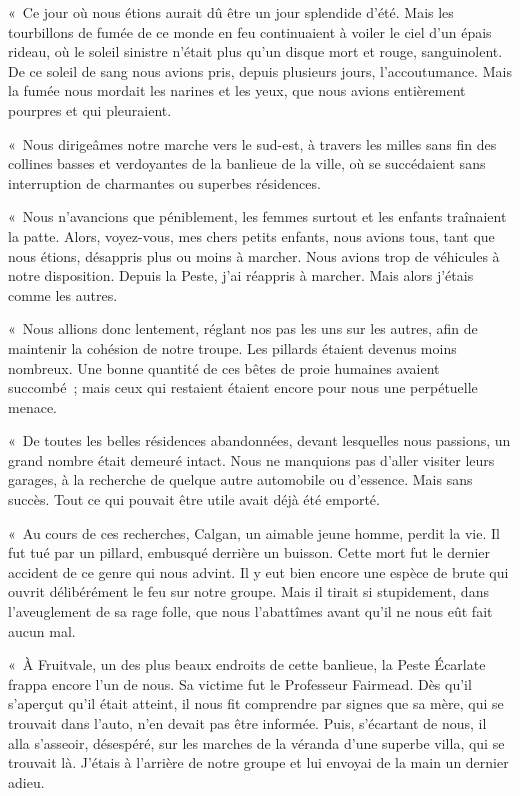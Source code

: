 \documentclass[french,twoside]{book} %
\newcommand\chaptercont{} %
\begin{document}
\chaptercont
\noindent « Ce jour où nous étions aurait dû être un jour splendide d’été. Mais les tourbillons de fumée de ce monde en feu continuaient à voiler le ciel d’un épais rideau, où le soleil sinistre n’était plus qu’un disque mort et rouge, sanguinolent. De ce soleil de sang nous avions pris, depuis plusieurs jours, l’accoutumance. Mais la fumée nous mordait les narines et les yeux, que nous avions entièrement pourpres et qui pleuraient.\par
« Nous dirigeâmes notre marche vers le sud-est, à travers les milles sans fin des collines basses et verdoyantes de la banlieue de la ville, où se succédaient sans interruption de charmantes ou superbes résidences.\par
« Nous n’avancions que péniblement, les femmes surtout et les enfants traînaient la patte. Alors, voyez-vous, mes chers petits enfants, nous avions tous, tant que nous étions, désappris plus ou moins à marcher. Nous avions trop de véhicules à notre disposition. Depuis la Peste, j’ai réappris à marcher. Mais alors j’étais comme les autres.\par
« Nous allions donc lentement, réglant nos pas les uns sur les autres, afin de maintenir la cohésion de notre troupe. Les pillards étaient devenus moins nombreux. Une bonne quantité de ces bêtes de proie humaines avaient succombé ; mais ceux qui restaient étaient encore pour nous une perpétuelle menace.\par
« De toutes les belles résidences abandonnées, devant lesquelles nous passions, un grand nombre était demeuré intact. Nous ne manquions pas d’aller visiter leurs garages, à la recherche de quelque autre automobile ou d’essence. Mais sans succès. Tout ce qui pouvait être utile avait déjà été emporté.\par
« Au cours de ces recherches, Calgan, un aimable jeune homme, perdit la vie. Il fut tué par un pillard, embusqué derrière un buisson. Cette mort fut le dernier accident de ce genre qui nous advint. Il y eut bien encore une espèce de brute qui ouvrit délibérément le feu sur notre groupe. Mais il tirait si stupidement, dans l’aveuglement de sa rage folle, que nous l’abattîmes avant qu’il ne nous eût fait aucun mal.\par
« À Fruitvale, un des plus beaux endroits de cette banlieue, la Peste Écarlate frappa encore l’un de nous. Sa victime fut le Professeur Fairmead. Dès qu’il s’aperçut qu’il était atteint, il nous fit comprendre par signes que sa mère, qui se trouvait dans l’auto, n’en devait pas être informée. Puis, s’écartant de nous, il alla s’asseoir, désespéré, sur les marches de la véranda d’une superbe villa, qui se trouvait là. J’étais à l’arrière de notre groupe et lui envoyai de la main un dernier adieu.\par
\end{document}
